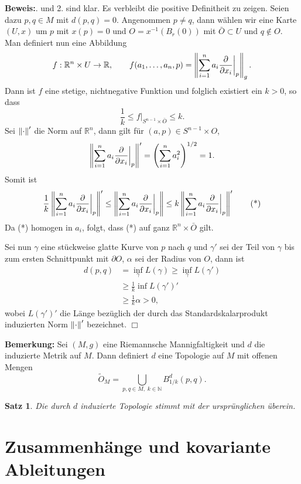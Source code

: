 \documentclass[12pt,a4paper]{article}
\def\R{\mathbb{R}}
\def\N{\mathbb{N}}
\newtheorem{Satz}[Lemma]{Satz}
\def\proof{\noindent\textbf{Beweis:}\quad}
\def\qed{\quad\hfill\ensuremath{\Box}}
\begin{document}
\proof
1. und 2. sind klar. Es verbleibt die positive Definitheit zu zeigen. Seien
dazu $p,q\in M$ mit $d(p,q)=0$.
Angenommen $p\neq q$, dann w\"ahlen wir eine Karte $(U,x)$
um $p$ mit $x(p) = 0$ und $O = x^{-1}(B_r(0))$ mit $\bar{O}\subset U$ und
$q\notin O$. Man definiert nun eine Abbildung $$
f: \R^n\times U \to \R,\qquad f(a_1,\ldots,a_n,p) = \norm{\sum_{i=1}^n a_i
\frac{\partial}{\partial x_i}\bigg|_p}_g.
$$
Dann ist $f$ eine stetige, nichtnegative Funktion und folglich existiert ein $k
>0 $, so dass
$$
\frac{1}{k} \le f\big|_{S^{n-1}\times \bar{O}} \le k.
$$
Sei $\left\|\cdot\right\|'$ die Norm auf $\R^n$, dann gilt f\"ur $(a,p)\in S^{n-1}\times
O$,
$$
\left\|\sum_{i=1}^n a_i \frac{\partial}{\partial x_i}\bigg|_p\right\|' =
\left(\sum_{i=1}^n a_i^2\right)^{1/2} = 1.
$$
Somit ist 
\begin{align*}
\frac{1}{k}\left\|\sum_{i=1}^n a_i \frac{\partial}{\partial x_i}\bigg|_p\right\|'
\le \left\|\sum_{i=1}^n a_i \frac{\partial}{\partial x_i}\bigg|_p\right\|
\le k\left\|\sum_{i=1}^n a_i \frac{\partial}{\partial x_i}\bigg|_p\right\|'\tag{*}
\end{align*}
Da (*) homogen in $a_i$, folgt, dass (*) auf ganz $\R^n\times\bar{O}$ gilt.

Sei nun $\gamma$ eine st\"uckweise glatte Kurve von $p$ nach $q$ und $\gamma'$ sei
der Teil von $\gamma$ bis zum ersten Schnittpunkt mit $\partial O$, $\alpha$ sei
der Radius von $O$, dann ist
\begin{align*}
d(p,q) &= \inf_\gamma L(\gamma)
\ge \inf_\gamma L(\gamma')\\
&\ge \frac{1}{k}\inf L(\gamma')' \\ &\ge \frac{1}{k}\alpha > 0,
\end{align*}
wobei $L(\gamma')'$ die L\"ange bez\"uglich der durch das Standardskalarprodukt
induzierten Norm $\left\|\cdot\right\|'$ bezeichnet.
\qed

\bigskip

{\bf Bemerkung:} Sei $(M,g)$ eine Riemannsche Mannigfaltigkeit und $d$ die
induzierte Metrik auf $M$. Dann definiert $d$ eine Topologie auf $M$ mit offenen
Mengen
$$
\tilde{O}_M = \bigcup_{p,q\in M,\;k\in\N} B_{1/k}^d(p,q).
$$

\begin{Satz}
Die durch $d$ induzierte Topologie stimmt mit der urspr\"unglichen \"uberein.
\end{Satz}
\bigskip

\section{Zusammenh\"ange und kovariante Ableitungen}
\end{document}
